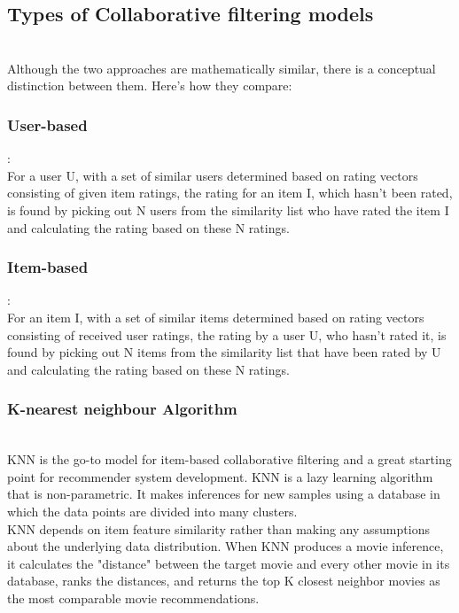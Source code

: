\documentclass[sigconf]{acmart}
\begin{document}
\subsection{Types of Collaborative filtering models}\\
Although the two approaches are mathematically similar, there is a conceptual distinction between them. Here's how they compare:

\subsubsection{\textbf{User-based}}: \\
For a user U, with a set of similar users determined based on rating vectors consisting of given item ratings, the rating for an item I, which hasn’t been rated, is found by picking out N users from the similarity list who have rated the item I and calculating the rating based on these N ratings.

\subsubsection{\textbf{Item-based}}: \\
For an item I, with a set of similar items determined based on rating vectors consisting of received user ratings, the rating by a user U, who hasn’t rated it, is found by picking out N items from the similarity list that have been rated by U and calculating the rating based on these N ratings.\\

\subsubsection{\textbf{K-nearest neighbour Algorithm}}\\

KNN is the go-to model for item-based collaborative filtering and a great starting point for recommender system development. KNN is a lazy learning algorithm that is non-parametric. It makes inferences for new samples using a database in which the data points are divided into many clusters.\\
KNN depends on item feature similarity rather than making any assumptions about the underlying data distribution. When KNN produces a movie inference, it calculates the "distance" between the target movie and every other movie in its database, ranks the distances, and returns the top K closest neighbor movies as the most comparable movie recommendations.
\end{document}
